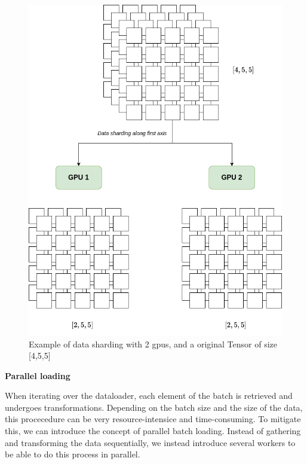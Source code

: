 \begin{figure}[h]
    \centering
    \includegraphics[scale=0.2]{figures/sharding.png}
    \caption{Example of data sharding with 2 gpus, and a original Tensor of size [4,5,5]}
    \label{fig:sharding}
\end{figure}


\textbf{Parallel loading}

When iterating over the dataloader, each element of the batch is retrieved and undergoes transformations. Depending on the batch size and  the size of the data, this procecedure can be very resource-intensice and time-consuming. To mitigate this, we can introduce the concept of parallel batch loading. Instead of gathering and transforming the data sequentially, we instead introduce several workers to be able to do this process in parallel. 


